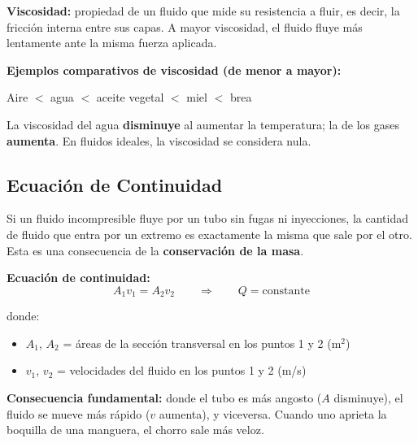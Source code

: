 \begin{seccion}

\begin{definicion}
\textbf{Viscosidad:} propiedad de un fluido que mide su resistencia a fluir, es decir, la fricción interna entre sus capas. A mayor viscosidad, el fluido fluye más lentamente ante la misma fuerza aplicada.
\end{definicion}

\begin{nota}
\textbf{Ejemplos comparativos de viscosidad (de menor a mayor):}

\hspace{1cm} Aire $<$ agua $<$ aceite vegetal $<$ miel $<$ brea

La viscosidad del agua \textbf{disminuye} al aumentar la temperatura; la de los gases \textbf{aumenta}. En fluidos ideales, la viscosidad se considera nula.
\end{nota}

\end{seccion}

\subsection{Ecuación de Continuidad}

\begin{seccion}
Si un fluido incompresible fluye por un tubo sin fugas ni inyecciones, la cantidad de fluido que entra por un extremo es exactamente la misma que sale por el otro. Esta es una consecuencia de la \textbf{conservación de la masa}.

\begin{ecuacion}
\textbf{Ecuación de continuidad:}
$$A_1 v_1 = A_2 v_2 \qquad \Longrightarrow \qquad Q = \text{constante}$$

donde:
\begin{itemize}
    \item $A_1$, $A_2$ = áreas de la sección transversal en los puntos 1 y 2 (m$^2$)
    \item $v_1$, $v_2$ = velocidades del fluido en los puntos 1 y 2 (m/s)
\end{itemize}
\end{ecuacion}

\textbf{Consecuencia fundamental:} donde el tubo es más angosto ($A$ disminuye), el fluido se mueve más rápido ($v$ aumenta), y viceversa. Cuando uno aprieta la boquilla de una manguera, el chorro sale más veloz.
\end{seccion}

